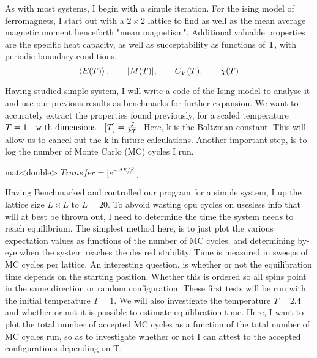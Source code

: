 \documentclass[10pt, twocolumn]{revtex4-1}
\begin{document}
As with most systems, I begin with a simple iteration. For the ising model of ferromagnets, I start out with a $2\times 2$ lattice to find
as well as the mean average magnetic moment henceforth "mean magnetism". Additional valuable properties are the specific heat capacity,
as well as succeptability as functions of T, with periodic boundary conditions.
\[
    \ev{E(T)}, \qq{} \abs{M(T)}, \qq{} C_V(T), \qq{} \chi(T)
\] %

Having studied simple system, I will write a code of the Ising model to analyse it and use our previous results as benchmarks for further expansion. We
want to accurately extract the properties found previously, for a scaled temperature $T = 1 \qq{with dimensions} \qty[ T ] = \frac{ J }{ kT }$. Here,
k is the Boltzman constant. This will allow us to cancel out the k in future calculations. Another important step, is to log the number of Monte Carlo
(MC) cycles I run.
\begin{algorithm}
    mat<double> $Transfer = [ e^{-\Delta E/ \beta }$ ]\;
    \caption{}
\end{algorithm}

Having Benchmarked and controlled our program for a simple system, I up the lattice size $L\times L$ to $L=20$. To abvoid wasting cpu cycles on usesless
info that will at best be thrown out, I need to determine the time the system needs to reach equilibrium. The simplest method here, is to just plot the
various expectation values as functions of the number of MC cycles. and determining by-eye when the system reaches the desired stability. Time is measured in
sweeps of MC cycles per lattice. An interesting question, is whether or not the equilibration time depends on the starting position. Whether this is
ordered so all spins point in the same direction or random configuration. These first tests will be run with the initial temperature $T=1$. We will also
investigate the temperature $T = 2.4$ and whether or not it is possible to estimate equilibration time. Here, I want to plot the total number of accepted
MC cycles as a function of the total number of MC cycles run, so as to investigate whether or not I can attest to the accepted configurations depending
on T.
\end{document}
